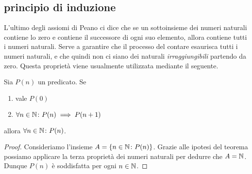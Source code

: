 \subsection{principio di induzione}

L'ultimo degli assiomi di Peano 
ci dice che se un sottoinsieme dei numeri naturali contiene lo 
zero e contiene il successore di ogni suo elemento, allora contiene tutti i 
numeri naturali.
Serve a garantire che il processo del contare esaurisca tutti 
i numeri naturali, e che quindi non ci siano dei naturali \emph{irraggiungibili}
partendo da zero.
Questa proprietà viene usualmente utilizzata mediante il seguente.


%
%
\begin{theorem}
  Sia $P(n)$ un predicato.
  Se 
  \begin{enumerate}
    \item vale $P(0)$
    \item $\forall n\in {\mathbb N}\colon P(n)\implies P(n+1)$
  \end{enumerate} 
  allora $\forall n\in {\mathbb N}\colon P(n)$.
\end{theorem}
%
\begin{proof}
  Consideriamo l'insieme $A=\{n\in {\mathbb N}\colon P(n)\}$.
  Grazie alle ipotesi del teorema possiamo applicare la terza
  proprietà dei numeri naturali per dedurre che $A={\mathbb N}$.
  Dunque $P(n)$ è soddisfatta per ogni $n\in{\mathbb N}$.
\end{proof}

